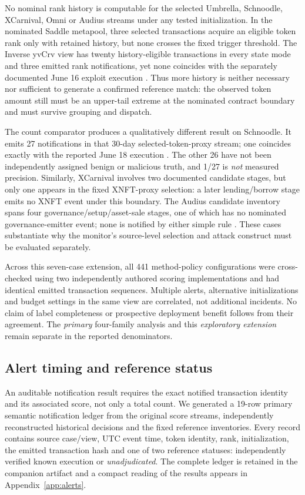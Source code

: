 \documentclass[preprint,12pt,authoryear]{elsarticle}
\begin{document}
No nominal rank history is computable for the selected Umbrella, Schnoodle, XCarnival, Omni or Audius streams under any tested initialization. In the nominated Saddle metapool, three selected transactions acquire an eligible token rank only with retained history, but none crosses the fixed trigger threshold. The Inverse yvCrv view has twenty history-eligible transactions in every state mode and three emitted rank notifications, yet none coincides with the separately documented June 16 exploit execution \citep{BlockSec2022Inverse}. Thus more history is neither necessary nor sufficient to generate a confirmed reference match: the observed token amount still must be an upper-tail extreme at the nominated contract boundary and must survive grouping and dispatch.

The count comparator produces a qualitatively different result on Schnoodle. It emits 27 notifications in that 30-day selected-token-proxy stream; one coincides exactly with the reported June 18 execution \citep{Schnoodle2022Analysis}. The other 26 have not been independently assigned benign or malicious truth, and 1/27 is \emph{not} measured precision. Similarly, XCarnival involves two documented candidate stages, but only one appears in the fixed XNFT-proxy selection: a later lending/borrow stage emits no XNFT event under this boundary. The Audius candidate inventory spans four governance/setup/asset-sale stages, one of which has no nominated governance-emitter event; none is notified by either simple rule \citep{XCarnival2022Account,Audius2022Report}. These cases substantiate why the monitor's source-level selection and attack construct must be evaluated separately.

Across this seven-case extension, all 441 method-policy configurations were cross-checked using two independently authored scoring implementations and had identical emitted transaction sequences. Multiple alerts, alternative initializations and budget settings in the same view are correlated, not additional incidents. No claim of label completeness or prospective deployment benefit follows from their agreement. The \emph{primary} four-family analysis and this \emph{exploratory extension} remain separate in the reported denominators.

\subsection{Alert timing and reference status}
An auditable notification result requires the exact notified transaction identity and its associated score, not only a total count. We generated a 19-row primary semantic notification ledger from the original score streams, independently reconstructed historical decisions and the fixed reference inventories. Every record contains source case/view, UTC event time, token identity, rank, initialization, the emitted transaction hash and one of two reference statuses: independently verified known execution or \emph{unadjudicated}. The complete ledger is retained in the companion artifact and a compact reading of the results appears in Appendix~\ref{app:alerts}.
\end{document}
